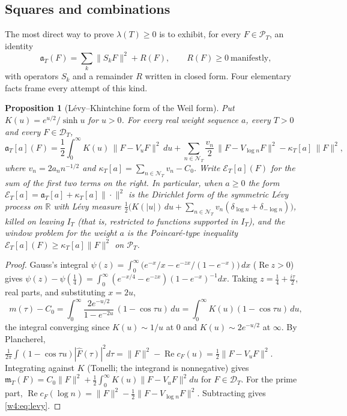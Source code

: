 \documentclass[11pt]{amsart}
\newtheorem{proposition}[theorem]{Proposition}
\theoremstyle{definition}
\theoremstyle{remark}
\numberwithin{equation}{section}
\newcommand{\R}{\mathbb{R}}
\DeclareMathOperator{\Rel}{Re}
\newcommand{\IT}{I_T}                                  %
\newcommand{\Fh}{\widehat F}                           %
\newcommand{\cF}{c_F}                                  %
\newcommand{\PT}{\mathcal{P}_T}                        %
\newcommand{\DT}{\mathcal{D}_T}                        %
\newcommand{\NT}{\mathcal{N}_T}                        %
\newcommand{\mT}{\mathfrak{m}_T}                       %
\newcommand{\aT}{\mathfrak{a}_T}                       %
\newcommand{\lam}{\lambda(T)}                          %
\begin{document}
\subsection{Squares and combinations}\label{w4:fam:R1}

The most direct way to prove $\lam\ge0$ is to exhibit, for every $F\in\PT$, an identity
\begin{equation}\label{w4:eq:sosshape}
\aT(F)=\sum_k\|S_kF\|^2+R(F),\qquad R(F)\ge0\ \text{manifestly},
\end{equation}
with operators $S_k$ and a remainder $R$ written in closed form. Four elementary facts frame every attempt of this kind.

\begin{proposition}[L\'evy--Khintchine form of the Weil form]\label{w4:prop:levy}
Put $K(u)=e^{u/2}/\sinh u$ for $u>0$. For every real weight sequence $a$, every $T>0$ and every $F\in\DT$,
\begin{equation}\label{w4:eq:levy}
\aT[a](F)=\frac12\int_0^\infty K(u)\,\|F-V_uF\|^2\,du+\sum_{n\in\NT}\frac{v_n}{2}\,\|F-V_{\log n}F\|^2-\kappa_T[a]\,\|F\|^2,
\end{equation}
where $v_n=2a_nn^{-1/2}$ and $\kappa_T[a]=\sum_{n\in\NT}v_n-C_0$. Write $\mathcal E_T[a](F)$ for the sum of the first two terms on the
right. In particular, when $a\ge0$ the form $\mathcal E_T[a]=\aT[a]+\kappa_T[a]\|\cdot\|^2$ is
the Dirichlet form of the symmetric L\'evy process on $\R$ with L\'evy measure $\frac12\big(K(|u|)\,du+\sum_{n\in\NT}v_n(\delta_{\log n}+\delta_{-\log n})\big)$,
killed on leaving $\IT$ (that is, restricted to functions supported in $\IT$), and the window problem for the weight $a$ is the Poincar\'e-type inequality
$\mathcal E_T[a](F)\ge\kappa_T[a]\|F\|^2$ on $\PT$.
\end{proposition}

\begin{proof}
Gauss's integral $\psi(z)=\int_0^\infty\big(e^{-x}/x-e^{-zx}/(1-e^{-x})\big)\,dx$ ($\Rel z>0$) gives
$\psi(z)-\psi(\tfrac14)=\int_0^\infty(e^{-x/4}-e^{-zx})(1-e^{-x})^{-1}dx$. Taking $z=\frac14+\frac{i\tau}2$, real parts, and substituting $x=2u$,
\[
m(\tau)-C_0=\int_0^\infty\frac{2e^{-u/2}}{1-e^{-2u}}\,(1-\cos\tau u)\,du=\int_0^\infty K(u)(1-\cos\tau u)\,du ,
\]
the integral converging since $K(u)\sim1/u$ at $0$ and $K(u)\sim2e^{-u/2}$ at $\infty$. By Plancherel,
$\frac1{2\pi}\int(1-\cos\tau u)|\Fh(\tau)|^2d\tau=\|F\|^2-\Rel\cF(u)=\frac12\|F-V_uF\|^2$. Integrating against $K$ (Tonelli; the integrand is
nonnegative) gives $\mT(F)=C_0\|F\|^2+\frac12\int_0^\infty K(u)\|F-V_uF\|^2du$ for $F\in\DT$. For the prime part,
$\Rel\cF(\log n)=\|F\|^2-\frac12\|F-V_{\log n}F\|^2$. Subtracting gives \eqref{w4:eq:levy}.
\end{proof}
\end{document}
